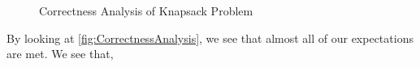 \documentclass[a4paper, 11pt]{article}
\begin{document}
\begin{figure}[!ht] 
  \caption{Correctness Analysis of Knapsack Problem} 
  \centering
  \label{fig:CorrectnessAnalysis}
\end{figure}

By looking at \autoref{fig:CorrectnessAnalysis}, we see that almost all of our expectations are met. We see that,
\end{document}

